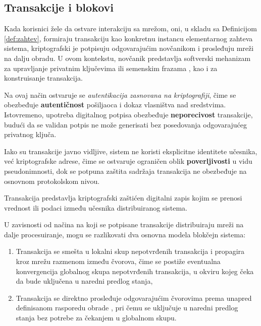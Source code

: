 \subsection{Transakcije i blokovi}
Kada korisnici žele da ostvare interakciju sa mrežom, oni, u skladu sa Definicijom \ref{def:zahtev}, formiraju transakciju kao konkretnu instancu elementarnog zahteva sistema, kriptografski je potpisuju odgovarajućim novčanikom i prosleđuju mreži na dalju obradu. U ovom kontekstu, novčanik  predstavlja softverski mehanizam za upravljanje privatnim ključevima ili semenskim frazama , kao i za konstruisanje transakcija.

Na ovaj način ostvaruje se \textit{autentikacija zasnovana na kriptografiji}, čime se obezbeđuje \textbf{autentičnost} pošiljaoca i dokaz vlasništva nad sredstvima. Istovremeno, upotreba digitalnog potpisa obezbeđuje \textbf{neporecivost} transakcije, budući da se validan potpis ne može generisati bez posedovanja odgovarajućeg privatnog ključa.

Iako su transakcije javno vidljive, sistem ne koristi eksplicitne identitete učesnika, već kriptografske adrese, čime se ostvaruje ograničen oblik \textbf{poverljivosti} u vidu pseudonimnosti, dok se potpuna zaštita sadržaja transakcija ne obezbeđuje na osnovnom protokolskom nivou.

\begin{definicija}
Transakcija predstavlja kriptografski zaštićen digitalni zapis kojim se prenosi vrednost ili podaci između učesnika distribuiranog sistema.
\end{definicija}

U zavisnosti od načina na koji se potpisane transakcije distribuiraju mreži na dalje procesuiranje, mogu se razlikovati dva osnovna modela blokčejn sistema:
\begin{enumerate}
\item Transakcija se smešta u lokalni skup nepotvrđenih transakcija  \cite{bai2025determining} i propagira kroz mrežu razmenom između čvorova, čime se postiže eventualna konvergencija globalnog skupa nepotvrđenih transakcija, u okviru kojeg čeka da bude uključena u naredni predlog stanja,
\item Transakcija se direktno prosleđuje odgovarajućim čvorovima prema unapred definisanom rasporedu obrade \cite{yakovenko2018solana}, pri čemu se uključuje u naredni predlog stanja bez potrebe za čekanjem u globalnom skupu.
\end{enumerate}

